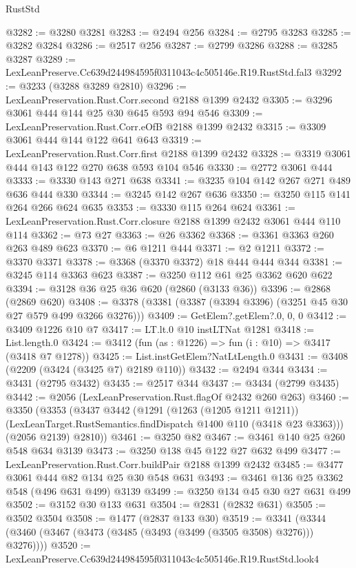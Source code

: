 \begin{lexlean}{RustStd}
\begin{coremodule}
@3282 := @3280 @3281
@3283 := @2494 @256
@3284 := @2795 @3283
@3285 := @3282 @3284
@3286 := @2517 @256
@3287 := @2799 @3286
@3288 := @3285 @3287
@3289 := LexLeanPreserve.Cc639d244984595f0311043c4c505146e.R19.RustStd.fal3
@3292 := @3233 (@3288 @3289 @2810)
@3296 := LexLeanPreservation.Rust.Corr.second @2188 @1399 @2432
@3305 := @3296 @3061 @444 @144 @25 @30 @645 @593 @94 @546
@3309 := LexLeanPreservation.Rust.Corr.eOfB @2188 @1399 @2432
@3315 := @3309 @3061 @444 @144 @122 @641 @643
@3319 := LexLeanPreservation.Rust.Corr.first @2188 @1399 @2432
@3328 := @3319 @3061 @444 @143 @122 @270 @638 @593 @104 @546
@3330 := @2772 @3061 @444
@3333 := @3330 @143 @271 @638
@3341 := @3235 @104 @142 @267 @271 @489 @636 @444 @330
@3344 := @3245 @142 @267 @636
@3350 := @3250 @115 @141 @264 @266 @624 @635
@3353 := @3330 @115 @264 @624
@3361 := LexLeanPreservation.Rust.Corr.closure @2188 @1399 @2432 @3061 @444 @110 @114
@3362 := @73 @27
@3363 := @26 @3362
@3368 := @3361 @3363 @260 @263 @489 @623
@3370 := @6 @1211 @444
@3371 := @2 @1211
@3372 := @3370 @3371
@3378 := @3368 (@3370 @3372) @18 @444 @444 @344
@3381 := @3245 @114 @3363 @623
@3387 := @3250 @112 @61 @25 @3362 @620 @622
@3394 := @3128 @36 @25 @36 @620 (@2860 (@3133 @36))
@3396 := @2868 (@2869 @620)
@3408 := @3378 (@3381 (@3387 (@3394 @3396) (@3251 @45 @30 @27 @579 @499 @3266 @3276)))
@3409 := GetElem?.getElem?.{0, 0, 0}
@3412 := @3409 @1226 @10 @7
@3417 := LT.lt.{0} @10 instLTNat @1281
@3418 := List.length.{0}
@3424 := @3412 (fun (as : @1226) => fun (i : @10) => @3417 (@3418 @7 @1278))
@3425 := List.instGetElem?NatLtLength.{0}
@3431 := @3408 (@2209 (@3424 (@3425 @7) @2189 @110))
@3432 := @2494 @344
@3434 := @3431 (@2795 @3432)
@3435 := @2517 @344
@3437 := @3434 (@2799 @3435)
@3442 := @2056 (LexLeanPreservation.Rust.flagOf @2432 @260 @263)
@3460 := @3350
    (@3353
      (@3437
        @3442
        (@1291
          (@1263 (@1205 @1211 @1211))
          (LexLeanTarget.RustSemantics.findDispatch @1400 @110 (@3418 @23 @3363)))
        (@2056 @2139)
        @2810))
@3461 := @3250 @82
@3467 := @3461 @140 @25 @260 @548 @634 @3139
@3473 := @3250 @138 @45 @122 @27 @632 @499
@3477 := LexLeanPreservation.Rust.Corr.buildPair @2188 @1399 @2432
@3485 := @3477 @3061 @444 @82 @134 @25 @30 @548 @631
@3493 := @3461 @136 @25 @3362 @548 (@496 @631 @499) @3139
@3499 := @3250 @134 @45 @30 @27 @631 @499
@3502 := @3152 @30 @133 @631
@3504 := @2831 (@2832 @631)
@3505 := @3502 @3504
@3508 := @1477 (@2837 @133 @30)
@3519 := @3341 (@3344 (@3460 (@3467 (@3473 (@3485 (@3493 (@3499 (@3505 @3508) @3276))) @3276))))
@3520 := LexLeanPreserve.Cc639d244984595f0311043c4c505146e.R19.RustStd.look4

\end{coremodule}
\end{lexlean}
